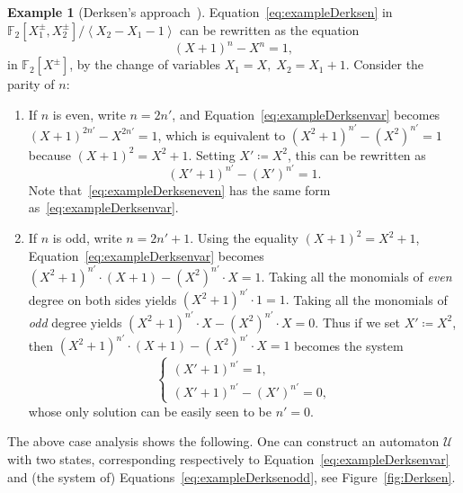 \documentclass[letterpaper, 11pt, thm-restate]{article}
\numberwithin{equation}{section}
\newcommand{\F}{\mathbb{F}}
\newcommand{\mmU}{\mathscr{U}}
\newcommand{\gen}[1]{\left\langle {#1} \right\rangle}
\theoremstyle{definition}
\theoremstyle{definition}
\newtheorem{exmpl}[thrm]{Example}
\theoremstyle{definition}
\begin{document}
\begin{exmpl}[Derksen's approach~\cite{derksen2007skolem}]
    Equation~\eqref{eq:exampleDerksen} in $\F_2[X_1^{\pm}, X_2^{\pm}]/\gen{X_2 - X_1 - 1}$ can be rewritten as the equation
    \begin{equation}\label{eq:exampleDerksenvar}
    (X+1)^n - X^n = 1,
    \end{equation}
    in $\F_2[X^{\pm}]$, by the change of variables $X_1 = X,\; X_2 = X_1+1$.
    Consider the parity of $n$:
    \begin{enumerate}[nosep, label = (\roman*)]
        \item If $n$ is even, write $n = 2n'$, and Equation~\eqref{eq:exampleDerksenvar} becomes $(X+1)^{2n'} - X^{2n'} = 1$, which is equivalent to $(X^2+1)^{n'} - {(X^2)}^{n'} = 1$ because $(X+1)^2 = X^2 + 1$.
        Setting $X' \coloneqq X^2$, this can be rewritten as
        \begin{equation}\label{eq:exampleDerkseneven}
        (X'+1)^{n'} - (X')^{n'} = 1.
        \end{equation}
        Note that~\eqref{eq:exampleDerkseneven} has the same form as~\eqref{eq:exampleDerksenvar}.
        \item If $n$ is odd, write $n = 2n' + 1$. Using the equality $(X+1)^2 = X^2 + 1$, Equation~\eqref{eq:exampleDerksenvar} becomes
        $
        (X^2+1)^{n'} \cdot (X+1) - {(X^2)}^{n'} \cdot X = 1.
        $
        Taking all the monomials of \emph{even} degree on both sides yields
        $
        (X^2+1)^{n'} \cdot 1 = 1.
        $
        Taking all the monomials of \emph{odd} degree yields
        $
        (X^2+1)^{n'} \cdot X - {(X^2)}^{n'} \cdot X = 0.
        $
        Thus if we set $X' \coloneqq X^2$, then $
        (X^2+1)^{n'} \cdot (X+1) - {(X^2)}^{n'} \cdot X = 1
        $ becomes the system
        \begin{equation}\label{eq:exampleDerksenodd}
        \begin{cases}
            (X'+1)^{n'} = 1, \\
            (X'+1)^{n'} - {(X')}^{n'} = 0,
        \end{cases}
        \end{equation}
        whose only solution can be easily seen to be $n' = 0$.
    \end{enumerate}
    The above case analysis shows the following. One can construct an automaton $\mmU$ with two states, corresponding respectively to Equation~\eqref{eq:exampleDerksenvar} and (the system of) Equations~\eqref{eq:exampleDerksenodd},
    see Figure~\ref{fig:Derksen}.
    \begin{figure}[h]

\end{figure}
\end{exmpl}
\end{document}
